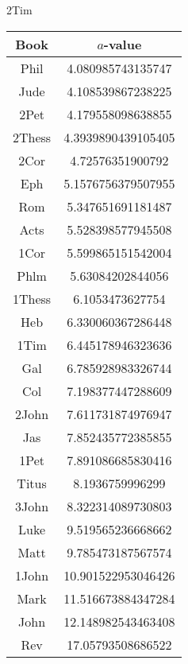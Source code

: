 \documentclass[12pt,letterpaper]{article}
\begin{document}
2Tim
\begin{longtable}{|c|c|}
\hline
 Book & $a$-value \\ \hline
Phil & 4.080985743135747 \\ \hline
 Jude & 4.108539867238225 \\ \hline
 2Pet & 4.179558098638855 \\ \hline
 2Thess & 4.3939890439105405 \\ \hline
 2Cor & 4.72576351900792 \\ \hline
 Eph & 5.1576756379507955 \\ \hline
 Rom & 5.347651691181487 \\ \hline
 Acts & 5.528398577945508 \\ \hline
 1Cor & 5.599865151542004 \\ \hline
 Phlm & 5.63084202844056 \\ \hline
 1Thess & 6.1053473627754 \\ \hline
 Heb & 6.330060367286448 \\ \hline
 1Tim & 6.445178946323636 \\ \hline
 Gal & 6.785928983326744 \\ \hline
 Col & 7.198377447288609 \\ \hline
 2John & 7.611731874976947 \\ \hline
 Jas & 7.852435772385855 \\ \hline
 1Pet & 7.891086685830416 \\ \hline
 Titus & 8.1936759996299 \\ \hline
 3John & 8.322314089730803 \\ \hline
 Luke & 9.519565236668662 \\ \hline
 Matt & 9.785473187567574 \\ \hline
 1John & 10.901522953046426 \\ \hline
 Mark & 11.516673884347284 \\ \hline
 John & 12.148982543463408 \\ \hline
 Rev & 17.05793508686522 \\ \hline 
\end{longtable}
\end{document}
